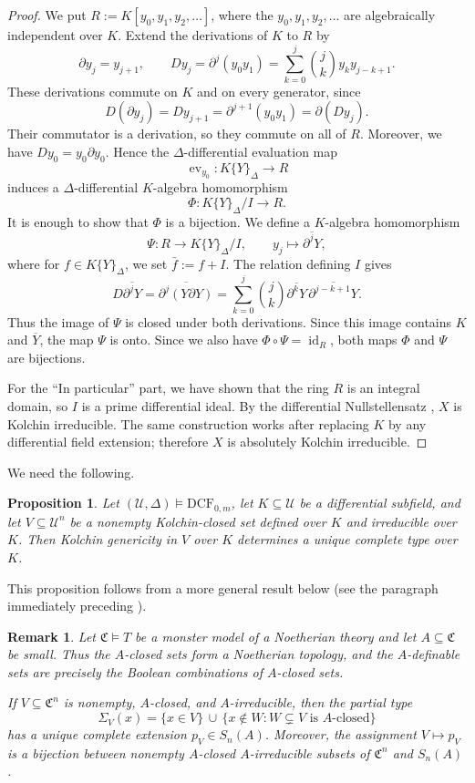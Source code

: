 \documentclass[10pt,a4paper]{amsart}
\newtheorem{proposition}[theorem]{Proposition}
\newtheorem{remark}[theorem]{Remark}
\begin{document}
\begin{proof}
We put $R:=K[y_0,y_1,y_2,\ldots]$, where the $y_0,y_1,y_2,\ldots$ are algebraically
independent over $K$. Extend the derivations of $K$ to $R$ by
\[
\partial y_j=y_{j+1},
\qquad
Dy_j=\partial^j(y_0y_1)
=\sum_{k=0}^{j}\binom{j}{k}y_ky_{j-k+1}.
\]
These derivations commute on $K$ and on every generator, since
\[
D(\partial y_j)=Dy_{j+1}
=\partial^{j+1}(y_0y_1)=\partial(Dy_j).
\]
Their commutator is a derivation, so they commute on all of $R$.
Moreover, we have $Dy_0=y_0\partial y_0$. Hence the $\Delta$-differential evaluation map 
\[
\operatorname{ev}_{y_0}:K\{Y\}_\Delta\longrightarrow R
\]
induces a $\Delta$-differential $K$-algebra homomorphism
\[
\Phi:K\{Y\}_{\Delta}/I\longrightarrow R.
\]
It is enough to show that $\Phi$ is a bijection. We define a $K$-algebra homomorphism
\[
\Psi:R\longrightarrow K\{Y\}_{\Delta}/I,
\qquad
y_j\longmapsto\overline{\partial^jY},
\]
where for $f\in K\{Y\}_{\Delta}$, we set $\bar{f}:=f+I$. The relation defining $I$ gives
\[
D\overline{\partial^jY}
=\overline{\partial^j(Y\partial Y)}
=\sum_{k=0}^{j}\binom{j}{k}
  \overline{\partial^kY}\,
  \overline{\partial^{j-k+1}Y}.
\]
Thus the image of $\Psi$ is closed under both derivations.
Since this image contains $K$ and $\overline Y$, the map $\Psi$ is onto.
Since we also have $\Phi\circ\Psi=\operatorname{id}_R$, both maps $\Phi$ and $\Psi$ are bijections.

For the ``In particular'' part, we have shown that the ring $R$ is an integral domain, so $I$ is a prime differential
ideal. By the differential Nullstellensatz
\cite[Chapter~IV, \S3, Theorem~2, p.~147]{Kolchin},
 $X$ is Kolchin
irreducible. The same construction works after replacing $K$ by
any differential field extension; therefore $X$ is absolutely
Kolchin irreducible.
\end{proof}
We need the following.
\begin{proposition}
Let $(\mathcal U,\Delta)\models\mathrm{DCF}_{0,m}$, let
$K\subseteq\mathcal U$ be a differential subfield, and let
$V\subseteq\mathcal U^n$ be a nonempty Kolchin-closed set defined
over $K$ and irreducible over $K$. Then Kolchin genericity in $V$
over $K$ determines a unique complete type over $K$.
\end{proposition}
This proposition follows from a more general result below (see the paragraph immediately preceding \cite[Proposition 4.7]{HK}).
\begin{remark}
Let 
$\mathfrak C\models T$ be a monster model of a Noetherian theory and let
$A\subseteq\mathfrak C$ be small. Thus the $A$-closed sets form
a Noetherian topology, and the $A$-definable sets are precisely
the Boolean combinations of $A$-closed sets.

If $V\subseteq\mathfrak C^n$ is nonempty, $A$-closed, and
$A$-irreducible, then the partial type
\[
 \Sigma_V(x)
 =
 \{x\in V\}
 \,\cup\,
 \{x\notin W:
     W\subsetneq V\text{ is }A\text{-closed}\}
\]
has a unique complete extension $p_V\in S_n(A)$. Moreover, the assignment $V\mapsto p_V$ is a bijection between
nonempty $A$-closed $A$-irreducible subsets of $\mathfrak C^n$
and $S_n(A)$.
\end{remark}
\end{document}
